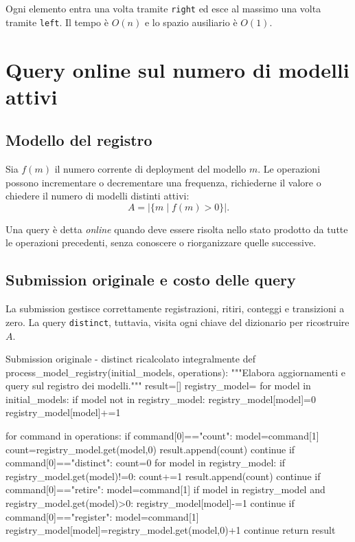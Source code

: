 Ogni elemento entra una volta tramite \texttt{right} ed esce al massimo una
volta tramite \texttt{left}. Il tempo è $O(n)$ e lo spazio ausiliario è
$O(1)$.

\section{Query online sul numero di modelli attivi}

\subsection{Modello del registro}

Sia $f(m)$ il numero corrente di deployment del modello $m$. Le operazioni
possono incrementare o decrementare una frequenza, richiederne il valore o
chiedere il numero di modelli distinti attivi:
\[
  A=\left|\{m\mid f(m)>0\}\right|.
\]

Una query è detta \emph{online} quando deve essere risolta nello stato prodotto
da tutte le operazioni precedenti, senza conoscere o riorganizzare quelle
successive.

\subsection{Submission originale e costo delle query}

La submission gestisce correttamente registrazioni, ritiri, conteggi e
transizioni a zero. La query \texttt{distinct}, tuttavia, visita ogni chiave
del dizionario per ricostruire $A$.

\begin{inefficientcode}{Submission originale - distinct ricalcolato integralmente}
def process_model_registry(initial_models, operations):
    """Elabora aggiornamenti e query sul registro dei modelli."""
    result=[]
    registry_model={}
    for model in initial_models:
        if model not in registry_model:
            registry_model[model]=0
        registry_model[model]+=1

    for command in operations:
        if command[0]=="count":
            model=command[1]
            count=registry_model.get(model,0)
            result.append(count)
            continue
        if command[0]=="distinct":
            count=0
            for model in registry_model:
                if registry_model.get(model)!=0:
                    count+=1
            result.append(count)
            continue
        if command[0]=="retire":
            model=command[1]
            if model in registry_model and registry_model.get(model)>0:
                registry_model[model]-=1
            continue
        if command[0]=="register":
            model=command[1]
            registry_model[model]=registry_model.get(model,0)+1
            continue
    return result
\end{inefficientcode}

